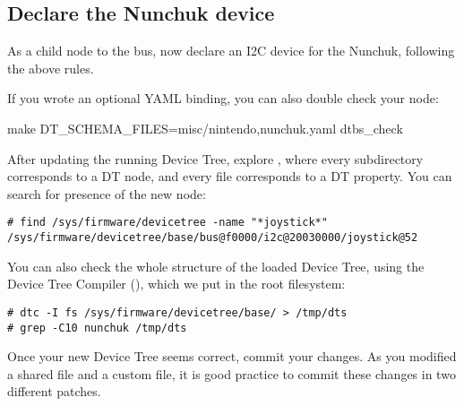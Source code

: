 \subsection{Declare the Nunchuk device}

As a child node to the  bus, now declare an I2C device
for the Nunchuk, following the above rules.

If you wrote an optional YAML binding, you can also double check your
node:
\begin{bashinput}
make DT_SCHEMA_FILES=misc/nintendo,nunchuk.yaml dtbs_check
\end{bashinput}

After updating the running Device Tree, explore
, where every subdirectory corresponds to
a DT node, and every file corresponds to a DT property. You can search
for presence of the new  node:

{\small
\begin{verbatim}
# find /sys/firmware/devicetree -name "*joystick*"
/sys/firmware/devicetree/base/bus@f0000/i2c@20030000/joystick@52
\end{verbatim}
}

You can also check the whole structure of the loaded Device Tree, using
the Device Tree Compiler (), which we put in the root
filesystem:
\begin{verbatim}
# dtc -I fs /sys/firmware/devicetree/base/ > /tmp/dts
# grep -C10 nunchuk /tmp/dts
\end{verbatim}

Once your new Device Tree seems correct, commit your changes. As you
modified a shared file and a custom file, it is good practice to commit
these changes in two different patches.
